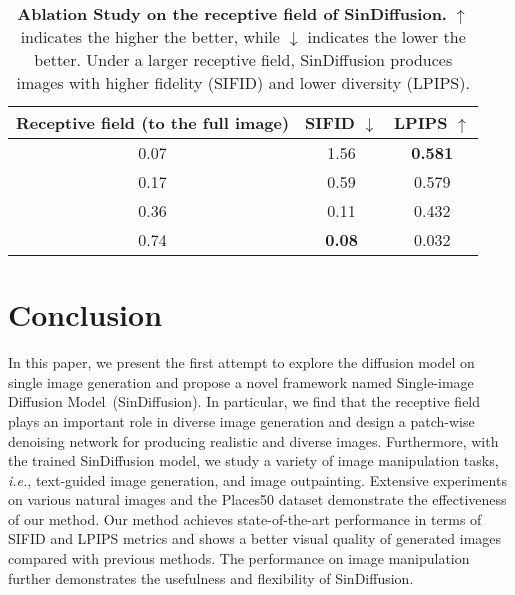 \documentclass[10pt,twocolumn,letterpaper]{article}
\begin{document}
\begin{table}[t]
    \footnotesize
    \centering
    \begin{tabular}{c @{\hskip 4mm} c @{\hskip 14mm} c}
    \toprule
    \textbf{Receptive field (to the full image)} & \textbf{SIFID} $\downarrow$ & \textbf{LPIPS} $\uparrow$ \\
    \midrule
    {0.07} & 1.56 & \textbf{0.581} \\
    {0.17} & 0.59 & 0.579 \\
    {0.36} & 0.11 & 0.432 \\
    {0.74} & \textbf{0.08} & 0.032 \\
    \bottomrule
    \end{tabular}
    \vspace{-3mm}
    \caption{\textbf{Ablation Study on the receptive field of SinDiffusion.}
    $\uparrow$ indicates the higher the better, while $\downarrow$ indicates the lower the better.
    Under a larger receptive field, SinDiffusion produces images with higher fidelity (SIFID) and lower diversity (LPIPS). 
    }
    \vspace{-6mm}
    \label{tab:receptive}
\end{table}

\vspace{-1mm}
\section{Conclusion}
In this paper, we present the first attempt to explore the diffusion model on single image generation and propose a novel framework named Single-image Diffusion Model~(SinDiffusion).
In particular, we find that the receptive field plays an important role in diverse image generation and design a patch-wise denoising network for producing realistic and diverse images.
Furthermore, with the trained SinDiffusion model, we study a variety of image manipulation tasks, \emph{i.e.}, text-guided image generation, and image outpainting.
Extensive experiments on various natural images and the Places50 dataset demonstrate the effectiveness of our method.
Our method achieves state-of-the-art performance in terms of SIFID and LPIPS metrics and shows a better visual quality of generated images compared with previous methods.
The performance on image manipulation further demonstrates the usefulness and flexibility of SinDiffusion.


{\small


}

\clearpage
\end{document}
